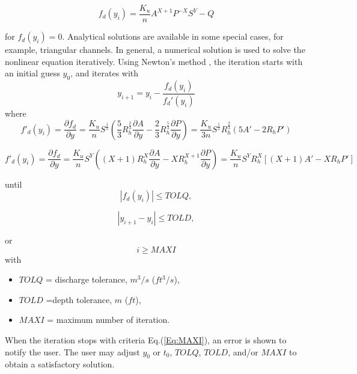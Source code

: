 \begin{equation}  
f_d(y_{i})= \frac{K_u}{n}A^{X+1}P^{-X}S^{Y} - Q 
\end{equation}

\noindent for $f_d(y_{i}) = 0$. Analytical solutions are available in some special cases, for example, triangular channels. In general, a numerical solution is used to solve the nonlinear equation iteratively. Using Newton's method \cite{Strang1991}, the iteration starts with an initial guess $y_0$, and iterates with
\begin{equation}  
y_{i+1} = y_i -\frac{f_d(y_{i})}{f_d'(y_{i})}
\end{equation}
where
\begin{equation}  
f'_d(y_{i})=\frac{\partial f_d}{\partial y}= \frac{K_u}{n}S^{\frac{1}{2}}\left(\frac{5}{3}R_h^{\frac{2}{3}}\frac{\partial A}{\partial y} -  \frac{2}{3}R_h^{\frac{5}{3}}\frac{\partial P}{\partial y}\right) = \frac{K_u}{3n}S^{\frac{1}{2}}R_h^{\frac{2}{3}}\left(5A' -  2R_hP'\right)
\end{equation}

\begin{equation}  
f'_d(y_{i})=\frac{\partial f_d}{\partial y}= \frac{K_u}{n}S^Y\left((X+1)R_h^X\frac{\partial A}{\partial y} -  XR_h^{X+1}\frac{\partial P}{\partial y}\right) = \frac{K_u}{n}S^YR_h^X\left[(X+1)A' -  XR_hP'\right]
\end{equation}

\noindent until 
\begin{equation}  
|f_d(y_{i})| \leq TOLQ, 
\label{Eq:TOLQ}
\end{equation}

\begin{equation}  
|y_{i+1} - y_i| \leq TOLD, 
\label{Eq:TOLD}
\end{equation}

\noindent or 
\begin{equation}  
i \geq MAXI 
\label{Eq:MAXI}
\end{equation}
with 
\begin{itemize}
\item[] $TOLQ$ = discharge tolerance, $m^3/s$ ($ft^3/s$),
\item[] $TOLD$ =depth tolerance, $m$ ($ft$),
\item[] $MAXI$ = maximum number of iteration.
\end{itemize}

\noindent When the iteration stops with criteria Eq.(\ref{Eq:MAXI}), an error is shown to notify the user. The user may adjust $y_0$ or $t_0$, $TOLQ$, $TOLD$, and/or $MAXI$ to obtain a satisfactory solution. 

